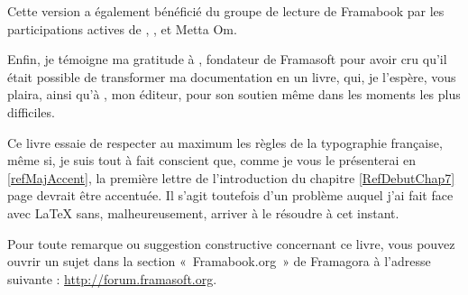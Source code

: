 \begin{Remerciements}
Cette version a également bénéficié du groupe de lecture de Framabook par les participations actives de ,  ,  et Metta Om.\par
Enfin, je témoigne ma gratitude à , fondateur de Framasoft pour avoir cru qu'il était possible de transformer ma documentation en un livre, qui, je l'espère, vous plaira, ainsi qu'à , mon éditeur, pour son soutien même dans les moments les plus difficiles.\par
Ce livre essaie de respecter au maximum les règles de la typographie française, même si, je suis tout à fait conscient que, comme je vous le présenterai en \ref{refMajAccent}, la première lettre de l'introduction du chapitre \ref{RefDebutChap7} page \pageref{RefDebutChap7} devrait être accentuée. Il s'agit toutefois d'un problème auquel j'ai fait face avec \LaTeX{} sans, malheureusement, arriver à le résoudre à cet instant.\par
Pour toute remarque ou suggestion constructive concernant ce livre, vous pouvez ouvrir un sujet dans la section «~Framabook.org~» de Framagora à l'adresse suivante : \url{http://forum.framasoft.org}.\par
\end{Remerciements}
